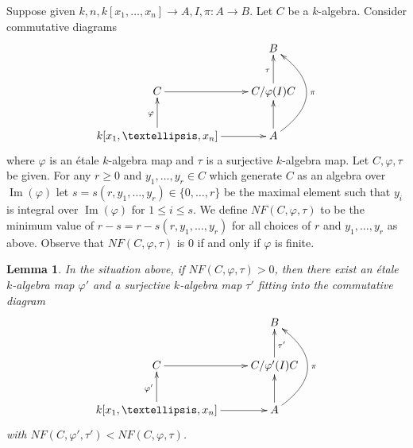 \documentclass{amsart}
\theoremstyle{plain}
\newtheorem{lemma}[subsection]{Lemma}
\theoremstyle{definition}
\theoremstyle{remark}
\numberwithin{equation}{subsection}
\def\Im{\mathop{\mathrm{Im}}}
\begin{document}
\medskip\noindent
Suppose given $k, n, k[x_1, \ldots, x_n] \to A, I, \pi : A \to B$.
Let $C$ be a $k$-algebra. Consider
commutative diagrams
$$
\xymatrix{
& B \\
C \ar[r] & C/\varphi(I)C \ar[u]^\tau \\
k[x_1, \ldots, x_n] \ar[u]^\varphi \ar[r] &
A \ar[u] \ar@/_3em/[uu]_\pi
}
$$
where $\varphi$ is an \'etale $k$-algebra map and $\tau$ is a
surjective $k$-algebra map.
Let $C, \varphi, \tau$ be given. For any $r \geq 0$ and
$y_1, \ldots, y_r \in C$ which generate $C$ as an algebra over
$\Im(\varphi)$ let $s = s(r, y_1, \ldots, y_r) \in \{0, \ldots, r\}$
be the maximal element such that $y_i$ is integral over $\Im(\varphi)$
for $1 \leq i \leq s$. We define $NF(C, \varphi, \tau)$
to be the minimum value of
$r - s = r - s(r, y_1, \ldots, y_r)$ for all choices of
$r$ and $y_1, \ldots, y_r$ as above.
Observe that $NF(C, \varphi, \tau)$ is $0$ if and only if $\varphi$ is finite.



\begin{lemma}
\label{lemma-lower-invariant}
In the situation above, if $NF(C, \varphi, \tau) > 0$, then there exist
an \'etale $k$-algebra map $\varphi'$ and a surjective $k$-algebra map
$\tau'$ fitting into the commutative diagram
$$
\xymatrix{
& B \\
C \ar[r] & C/\varphi'(I)C \ar[u]_{\tau'} \\
k[x_1, \ldots, x_n] \ar[u]^{\varphi'} \ar[r] &
A \ar[u] \ar@/_3em/[uu]_\pi
}
$$
with $NF(C, \varphi', \tau') < NF(C, \varphi, \tau)$.
\end{lemma}
\end{document}
